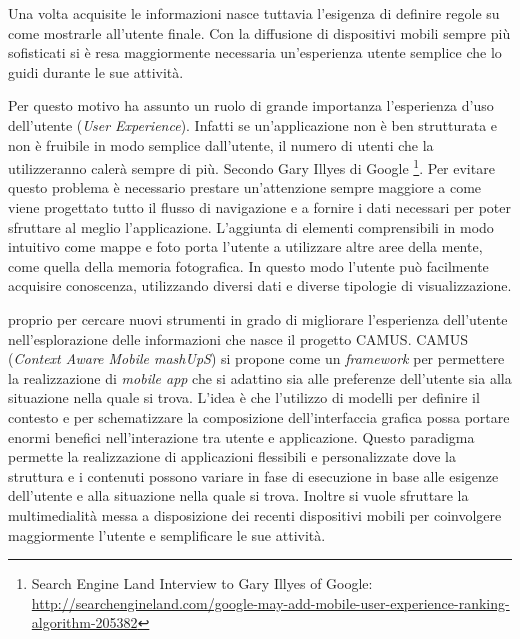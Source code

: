 Una volta acquisite le informazioni nasce tuttavia l'esigenza di definire regole su come mostrarle all'utente finale. Con la diffusione di dispositivi mobili sempre più sofisticati si è resa maggiormente necessaria un'esperienza utente semplice che lo guidi durante le sue attività.


Per questo motivo ha assunto un ruolo di grande importanza l'esperienza d'uso dell'utente (\emph{User Experience}). Infatti se un'applicazione non è ben strutturata e non è fruibile in modo semplice dall'utente, il numero di utenti che la utilizzeranno calerà sempre di più. Secondo Gary Illyes di Google \footnote{Search Engine Land Interview to Gary Illyes of Google: \url{http://searchengineland.com/google-may-add-mobile-user-experience-ranking-algorithm-205382}}. Per evitare questo problema è necessario prestare un'attenzione sempre maggiore a come viene progettato tutto il flusso di navigazione e a fornire i dati necessari per poter sfruttare al meglio l'applicazione. L'aggiunta di elementi comprensibili in modo intuitivo come mappe e foto porta l'utente a utilizzare altre aree della mente, come quella della memoria fotografica. In questo modo l'utente può facilmente acquisire conoscenza, utilizzando diversi dati e diverse tipologie di visualizzazione.


\upe proprio per cercare nuovi strumenti in grado di migliorare l'esperienza dell'u\-ten\-te nell'esplorazione delle informazioni che nasce il progetto CAMUS. CAMUS (\emph{Context Aware Mobile mashUpS}) si propone come un \emph{framework} per permettere la realizzazione di \emph{mobile app} che si adattino sia alle preferenze dell'utente sia alla situazione nella quale si trova. L'idea è che l'utilizzo di modelli per definire il contesto e per schematizzare la composizione dell'interfaccia grafica possa portare enormi benefici nell'interazione tra utente e applicazione.
Questo paradigma permette la realizzazione di applicazioni flessibili e personalizzate dove la struttura e i contenuti possono variare in fase di esecuzione in base alle esigenze dell'utente e alla situazione nella quale si trova. Inoltre si vuole sfruttare la multimedialità messa a disposizione dei recenti dispositivi mobili per coinvolgere maggiormente l'utente e semplificare le sue attività.

